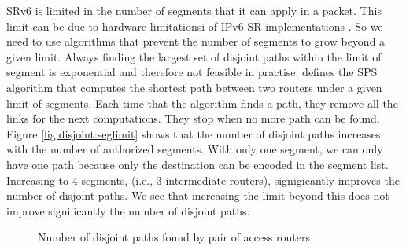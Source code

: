 SRv6 is limited in the number of segments that it can apply in a packet.
This limit can be due to hardware limitationsi of IPv6 SR implementations \cite{Tantsura_SID:2017}.
So we need to use algorithms that prevent the number of segments to grow beyond a given limit.
Always finding the largest set of disjoint paths within the limit of segment is exponential and therefore not feasible in practise.
\cite{aubry2015traffic} defines the SPS algorithm that computes the shortest path between two routers
under a given limit of segments.
Each time that the algorithm finds a path, they remove all the links for the next computations.
They stop when no more path can be found.
Figure \ref{fig:disjoint:seglimit} shows that the number of disjoint paths increases with the number of authorized segments.
With only one segment, we can only  have one path because only the destination can be encoded in the segment list.
Increasing to 4 segments, (i.e., 3 intermediate routers), signigicantly improves the number of disjoint paths.
We see that increasing the limit beyond this does not improve significantly the number of disjoint paths.


\begin{figure*}
	\centering
	\caption{Number of disjoint paths found by pair of access routers}
	\label{fig:disjoint}
\end{figure*}







